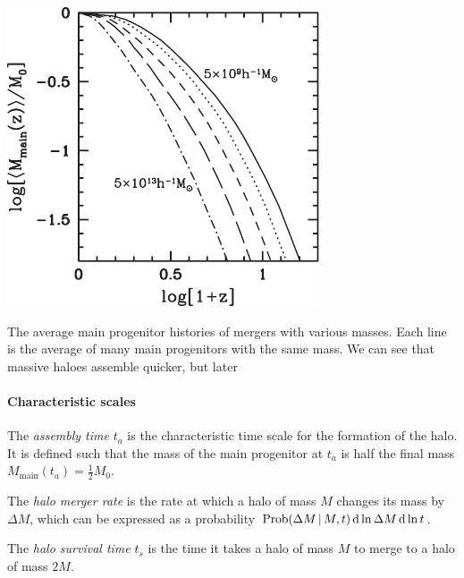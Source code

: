 \begin{marginfigure}
	\includegraphics[width=\textwidth]{img/ch-04/progenitor-average.pdf}
	\caption{The average main progenitor histories of mergers with various masses. Each line is the average of many main progenitors with the same mass. We can see that massive haloes assemble quicker, but later}
	\label{fig:progenitor-average}
\end{marginfigure}



\paragraph*{Characteristic scales}

The \emph{assembly time} $t_a$ is the characteristic time scale for the formation of the halo.
It is defined such that the mass of the main progenitor at $t_a$ is half the final mass $M_\text{main}(t_a) = \frac{1}{2}M_0$.

The \emph{halo merger rate} is the rate at which a halo of mass $M$ changes its mass by $\Delta M$, which can be expressed as a probability $\operatorname{Prob}(\Delta M \, | \, M, t) \dd{\ln \Delta M} \dd{\ln t}$.

The \emph{halo survival time} $t_s$ is the time it takes a halo of mass $M$ to merge to a halo of mass $2 M$.






